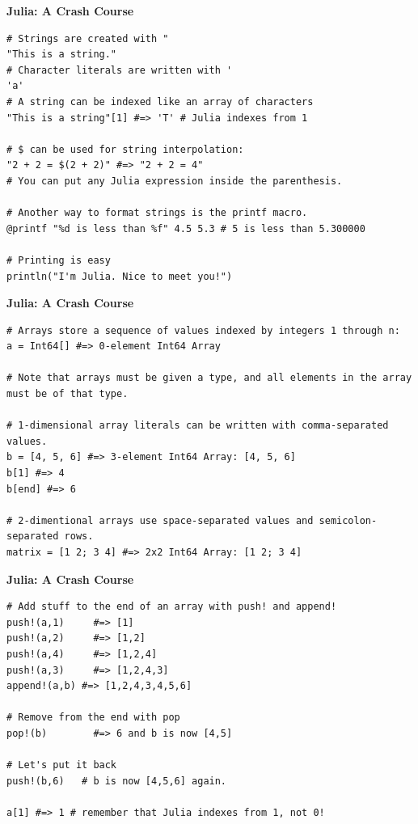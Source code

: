 \documentclass[xcolor=dvipsnames]{beamer}
\begin{document}
\begin{frame}[fragile]
{\bf Julia: A Crash Course}
\begin{lstlisting}
# Strings are created with "
"This is a string."
# Character literals are written with '
'a'
# A string can be indexed like an array of characters
"This is a string"[1] #=> 'T' # Julia indexes from 1

# $ can be used for string interpolation:
"2 + 2 = $(2 + 2)" #=> "2 + 2 = 4"
# You can put any Julia expression inside the parenthesis.

# Another way to format strings is the printf macro.
@printf "%d is less than %f" 4.5 5.3 # 5 is less than 5.300000

# Printing is easy
println("I'm Julia. Nice to meet you!")
\end{lstlisting}
\end{frame}

\begin{frame}[fragile]
{\bf Julia: A Crash Course}
\begin{lstlisting}
# Arrays store a sequence of values indexed by integers 1 through n:
a = Int64[] #=> 0-element Int64 Array

# Note that arrays must be given a type, and all elements in the array must be of that type.

# 1-dimensional array literals can be written with comma-separated values.
b = [4, 5, 6] #=> 3-element Int64 Array: [4, 5, 6]
b[1] #=> 4
b[end] #=> 6

# 2-dimentional arrays use space-separated values and semicolon-separated rows.
matrix = [1 2; 3 4] #=> 2x2 Int64 Array: [1 2; 3 4]
\end{lstlisting}
\end{frame}

\begin{frame}[fragile]
{\bf Julia: A Crash Course}
\begin{lstlisting}
# Add stuff to the end of an array with push! and append!
push!(a,1)     #=> [1]
push!(a,2)     #=> [1,2]
push!(a,4)     #=> [1,2,4]
push!(a,3)     #=> [1,2,4,3]
append!(a,b) #=> [1,2,4,3,4,5,6]

# Remove from the end with pop
pop!(b)        #=> 6 and b is now [4,5]

# Let's put it back
push!(b,6)   # b is now [4,5,6] again.

a[1] #=> 1 # remember that Julia indexes from 1, not 0!
\end{lstlisting}
\end{frame}
\end{document}
